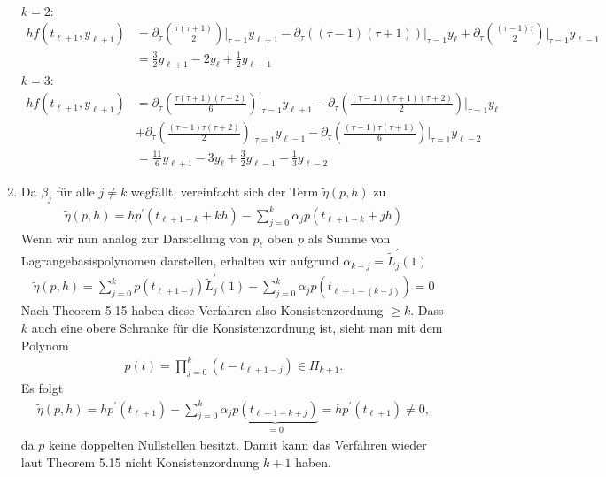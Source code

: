 \begin{solution}
\begin{enumerate}[label = \textbf{\alph*)}]
\begin{align*}
  \end{align*}
  $k = 2$:
  \begin{align*}
  hf(t_{\ell + 1},y_{\ell + 1}) &= \partial_{\tau}\left(\frac{\tau(\tau + 1)}{2}\right)
  \Bigg|_{\tau = 1}y_{\ell + 1} -
  \partial_{\tau}\left((\tau - 1)(\tau + 1)\right)
  \Bigg|_{\tau = 1}y_{\ell} +
  \partial_{\tau}\left(\frac{(\tau - 1)\tau}{2}\right)
  \Bigg|_{\tau = 1}y_{\ell - 1} \\
  &= \frac{3}{2}y_{\ell + 1} - 2y_{\ell} + \frac{1}{2}y_{\ell - 1}
  \end{align*}
  $k = 3$:
  \begin{align*}
  hf(t_{\ell + 1},y_{\ell + 1}) &= \partial_{\tau}\left(\frac{\tau(\tau + 1)(\tau + 2)}{6}\right)
  \Bigg|_{\tau = 1}y_{\ell + 1} -
  \partial_{\tau}\left(\frac{(\tau - 1)(\tau + 1)(\tau + 2)}{2}\right)
  \Bigg|_{\tau = 1}y_{\ell} \\
  &+ \partial_{\tau}\left(\frac{(\tau - 1)\tau(\tau + 2)}{2}\right)
  \Bigg|_{\tau = 1}y_{\ell - 1} -
  \partial_{\tau}\left(\frac{(\tau - 1)\tau(\tau + 1)}{6}\right)
  \Bigg|_{\tau = 1}y_{\ell - 2}
  \\
  &= \frac{11}{6}y_{\ell + 1} - 3y_{\ell} + \frac{3}{2}y_{\ell - 1} - \frac{1}{3}y_{\ell - 2}
  \end{align*}
  \item Da $\beta_j$ für alle $j \neq k$ wegfällt, vereinfacht sich der Term
  $\tilde{\eta}(p,h)$ zu
  \begin{align*}
    \tilde{\eta}(p,h) = hp^{\prime}(t_{\ell + 1 - k} + kh) -
    \sum_{j = 0}^k \alpha_jp(t_{\ell + 1 - k} + jh)
  \end{align*}
  Wenn wir nun analog zur Darstellung von $p_{\ell}$ oben $p$ als Summe
  von Lagrangebasispolynomen darstellen, erhalten wir aufgrund
  $\alpha_{k-j} = \tilde{L}_j^{\prime}(1)$
  \begin{align*}
    \tilde{\eta}(p,h) = \sum_{j= 0}^k p(t_{\ell + 1 - j})\tilde{L}_j^{\prime}(1)
    - \sum_{j = 0}^k \alpha_jp(t_{\ell + 1 - (k - j)}) = 0
  \end{align*}
  Nach Theorem 5.15 haben diese Verfahren also Konsistenzordnung $\geq k$.
  Dass $k$ auch eine obere Schranke für die Konsistenzordnung ist, sieht man mit
  dem Polynom
  \begin{align*}
    p(t) = \prod_{j = 0}^k (t- t_{\ell + 1 - j}) \in \Pi_{k+1}.
  \end{align*}
  Es folgt
  \begin{align*}
    \tilde{\eta}(p,h) = hp^{\prime}(t_{\ell + 1}) - \sum_{j = 0}^k \alpha_j \underbrace{p(t_{\ell + 1 - k + j})}_{=0}
    = hp^{\prime}(t_{\ell + 1}) \neq 0,
  \end{align*}
  da $p$ keine doppelten Nullstellen besitzt.
  Damit kann das Verfahren wieder laut Theorem 5.15 nicht Konsistenzordnung $k + 1$ haben.
\end{enumerate}
\end{solution}
